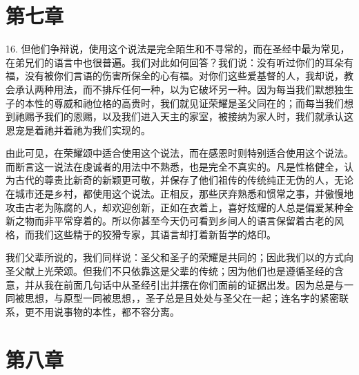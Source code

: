
\section{第七章}

\par

16. 但他们争辩说，使用这个说法是完全陌生和不寻常的，而在圣经中最为常见，在弟兄们的语言中也很普遍。我们对此如何回答？我们说：没有听过你们的耳朵有福，没有被你们言语的伤害所保全的心有福。对你们这些爱基督的人，我却说，教会承认两种用法，而不排斥任何一种，以为它破坏另一种。因为每当我们默想独生子的本性的尊威和祂位格的高贵时，我们就见证荣耀是圣父同在的；而每当我们想到祂赐予我们的恩赐，以及我们进入天主的家室，被接纳为家人时，我们就承认这恩宠是着祂并着祂为我们实现的。\par

由此可见，在荣耀颂中适合使用这个说法，而在感恩时则特别适合使用这个说法。而断言这一说法在虔诚者的用法中不熟悉，也是完全不真实的。凡是性格健全，认为古代的尊贵比新奇的新颖更可敬，并保存了他们祖传的传统纯正无伪的人，无论在城市还是乡村，都使用这个说法。正相反，那些厌弃熟悉和惯常之事，并傲慢地攻击古老为陈腐的人，却欢迎创新，正如在衣着上，喜好炫耀的人总是偏爱某种全新之物而非平常穿着的。所以你甚至今天仍可看到乡间人的语言保留着古老的风格，而我们这些精于的狡猾专家，其语言却打着新哲学的烙印。\par

我们父辈所说的，我们同样说：圣父和圣子的荣耀是共同的；因此我们以的方式向圣父献上光荣颂。但我们不只依靠这是父辈的传统；因为他们也是遵循圣经的含意，并从我在前面几句话中从圣经引出并摆在你们面前的证据出发。因为总是与一同被思想，与原型一同被思想，，圣子总是且处处与圣父在一起；连名字的紧密联系，更不用说事物的本性，都不容分离。\par


\section{第八章}

